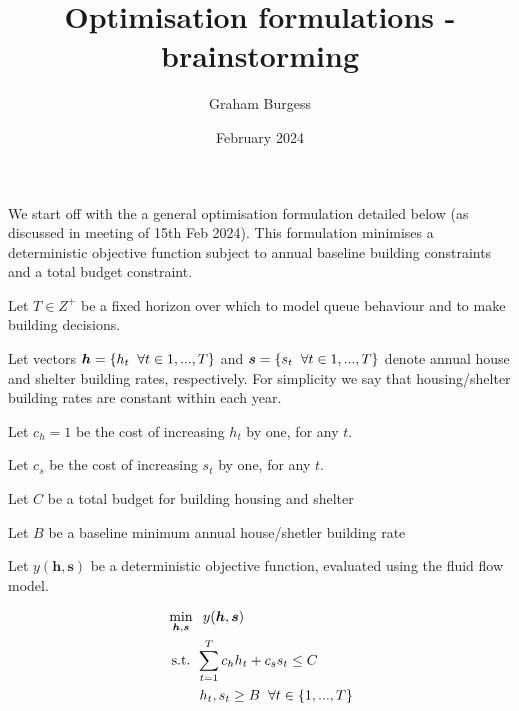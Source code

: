 \documentclass{article}
\title{Optimisation formulations - brainstorming}
\author{Graham Burgess}
\date{February 2024}
\begin{document}
%
\maketitle
%
We start off with the a general optimisation formulation detailed below (as discussed in meeting of 15th Feb 2024). This formulation minimises a deterministic objective function subject to annual baseline building constraints and a total budget constraint. \par
%
Let $T \in Z^{+}$ be a fixed horizon over which to model queue behaviour and to make building decisions. \par
%
Let vectors $\boldsymbol{h} = \{h_t \hspace{0.2cm} \forall t \in {1,...,T}\}$ and $\boldsymbol{s} = \{s_t \hspace{0.2cm} \forall t \in {1,...,T}\}$ denote annual house and shelter building rates, respectively. For simplicity we say that housing/shelter building rates are constant within each year. \par
%
Let $c_{h} = 1$ be the cost of increasing $h_t$ by one, for any $t$. \par
%
Let $c_{s}$ be the cost of increasing $s_t$ by one, for any $t$. \par
%
Let $C$ be a total budget for building housing and shelter \par
%
Let $B$ be a baseline minimum annual house/shetler building rate \par
%
Let $y(\boldsymbol{h},\boldsymbol{s})$ be a deterministic objective function, evaluated using the fluid flow model. \par
%
\begin{align*}
        & \min_{\boldsymbol{h},\boldsymbol{s}} \hspace{0.2cm} y(\boldsymbol{h},\boldsymbol{s}) \\
        & \text{ s.t. } \sum_{t=1}^{T} c_{h}h_{t} + c_{s}s_{t} \leq C \\
        & \hspace{0.82cm} h_t, s_t \geq B \hspace{0.2cm} \forall t \in \{1, ..., T\}
\end{align*}
%
\end{document}
